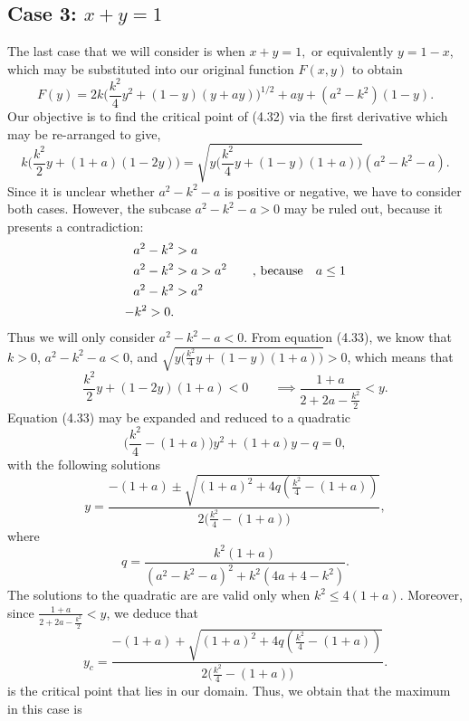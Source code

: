 \documentclass[11pt,reqno]{amsart}
\theoremstyle{definition}
\numberwithin{equation}{section} \setcounter{tocdepth}{1}
\numberwithin{equation}{section}
\begin{document}
\subsection{Case 3: $x+y=1$}The last case that we will consider is when $x+y=1,$ or equivalently $y=1-x$, which may be substituted into our original function $F(x,y)$ to obtain
\begin{equation}
    F(y)=2k\bigg(\frac{k^2}{4}y^2+(1-y)(y+ay)\bigg)^{1/2}+ay+(a^2-k^2)(1-y).
\end{equation} Our objective is to find the critical point of (4.32) via the first derivative which may be re-arranged to give,
\begin{equation}
     k\bigg(\frac{k^2}{2}y+(1+a)(1-2y)\bigg)=\sqrt{y\bigg(\frac{k^2}{4}y+(1-y)(1+a)\bigg)}(a^2-k^2-a).
\end{equation}
Since it is unclear whether $a^2-k^2-a$ is positive or negative, we have to consider both cases. However, the subcase $a^2-k^2-a>0$ may be ruled out, because it presents a contradiction:
\begin{align}
    a^2-k^2&>a\notag\\
    a^2-k^2&>a>a^2 \qquad \text{, because} \quad a \leq 1\notag\\
    a^2-k^2&>a^2 \notag\\
    -k^2>0 \notag.
\end{align} Thus we will only consider $a^2-k^2-a<0$. From equation (4.33), we know that $k>0$, $a^2-k^2-a<0$, and $\sqrt{y\bigg(\frac{k^2}{4}y+(1-y)(1+a)\bigg)}>0$, which means that
\begin{equation}
   \frac{k^2}{2}y+(1-2y)(1+a)<0 \qquad \implies
     \frac{1+a}{2+2a-\frac{k^2}{2}}<y.
\end{equation}
Equation (4.33) may be expanded and reduced to a quadratic
\begin{equation}
          \bigg(\frac{k^2}{4}-(1+a)\bigg)y^2+(1+a)y-q=0,
\end{equation} with the following solutions
 \begin{equation}
     y=\frac{-(1+a) \pm \sqrt{(1+a)^2+4q(\frac{k^2}{4}-(1+a))}}{2\bigg(\frac{k^2}{4}-(1+a)\bigg)},
 \end{equation}where
 \begin{equation}
     q=\frac{k^2(1+a)}{(a^2-k^2-a)^2+k^2(4a+4-k^2)}.
 \end{equation}The solutions to the quadratic are
   are valid only when $k^2 \leq 4(1+a)$. Moreover, since $\frac{1+a}{2+2a-\frac{k^2}{2}}<y$, we deduce that
 \begin{equation}
    y_c=\frac{-(1+a) + \sqrt{(1+a)^2+4q(\frac{k^2}{4}-(1+a))}}{2\bigg(\frac{k^2}{4}-(1+a)\bigg)}.
 \end{equation} is the critical point that lies in our domain. Thus, we obtain that the maximum in this case is
\end{document}

